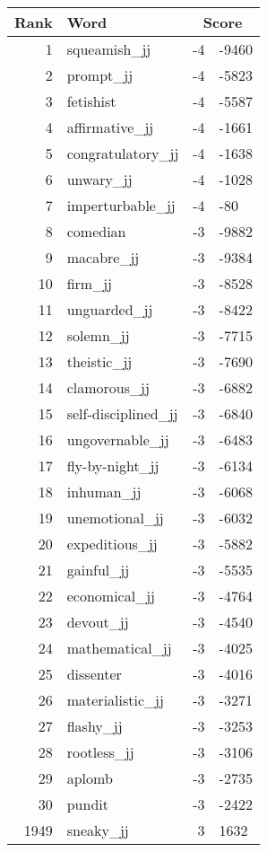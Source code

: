 \begin{longtable}[!htbp]{| rlr@{.}l |}
    \hline
    \textbf{Rank} & \textbf{Word} & \multicolumn{2}{c|}{\textbf{Score}} \\
    \hline
    \endhead
    1 & squeamish\_jj & -4 & -9460 \\
    2 & prompt\_jj & -4 & -5823 \\
    3 & fetishist & -4 & -5587 \\
    4 & affirmative\_jj & -4 & -1661 \\
    5 & congratulatory\_jj & -4 & -1638 \\
    6 & unwary\_jj & -4 & -1028 \\
    7 & imperturbable\_jj & -4 & -80 \\
    8 & comedian & -3 & -9882 \\
    9 & macabre\_jj & -3 & -9384 \\
    10 & firm\_jj & -3 & -8528 \\
    11 & unguarded\_jj & -3 & -8422 \\
    12 & solemn\_jj & -3 & -7715 \\
    13 & theistic\_jj & -3 & -7690 \\
    14 & clamorous\_jj & -3 & -6882 \\
    15 & self-disciplined\_jj & -3 & -6840 \\
    16 & ungovernable\_jj & -3 & -6483 \\
    17 & fly-by-night\_jj & -3 & -6134 \\
    18 & inhuman\_jj & -3 & -6068 \\
    19 & unemotional\_jj & -3 & -6032 \\
    20 & expeditious\_jj & -3 & -5882 \\
    21 & gainful\_jj & -3 & -5535 \\
    22 & economical\_jj & -3 & -4764 \\
    23 & devout\_jj & -3 & -4540 \\
    24 & mathematical\_jj & -3 & -4025 \\
    25 & dissenter & -3 & -4016 \\
    26 & materialistic\_jj & -3 & -3271 \\
    27 & flashy\_jj & -3 & -3253 \\
    28 & rootless\_jj & -3 & -3106 \\
    29 & aplomb & -3 & -2735 \\
    30 & pundit & -3 & -2422 \\
    1949 & sneaky\_jj & 3 & 1632 \\

\end{longtable}
